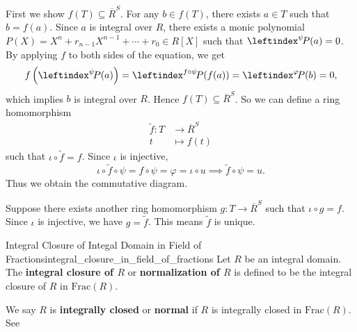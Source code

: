 \begin{prf}
    First we show $f(T)\subseteq \overline{R}^S$. For any $b\in f(T)$, there exists $a\in T$ such that $b=f(a)$. Since $a$ is integral over $R$, there exists a monic polynomial $P(X)=X^n+r_{n-1}X^{n-1}+\cdots+r_0\in R[X]$ such that $\leftindex^{\psi}\!P(a)=0$. By applying $f$ to both sides of the equation, we get
    \[
        f\left(\leftindex^{\psi}\!P(a)\right)=\leftindex^{f\circ \psi}\!P(f(a))=\leftindex^{\varphi}\!P(b)=0,
    \]
    which implies $b$ is integral over $R$. Hence $f(T)\subseteq \overline{R}^S$. So we can define a ring homomorphism
    \begin{align*}
        \widetilde{f}:T&\longrightarrow \overline{R}^S\\
        t&\longmapsto f(t)
    \end{align*}
   such that $\iota\circ \widetilde{f}=f$. Since $\iota$ is injective,
   \[
   \iota\circ \widetilde{f}\circ \psi=f\circ \psi=\varphi=\iota\circ u\implies \widetilde{f}\circ \psi=u.
   \]
   Thus we obtain the commutative diagram.

   Suppose there exists another ring homomorphism $g:T\to \overline{R}^S$ such that $\iota\circ g=f$. Since $\iota$ is injective, we have $g=\widetilde{f}$. This means $\widetilde{f}$ is unique.
\end{prf}
   

\begin{definition}{Integral Closure of Integal Domain in Field of Fractions}{integral_closure_in_field_of_fractions}
    Let $R$ be an integral domain. The \textbf{integral closure of $R$} or \textbf{normalization of $R$} is defined to be the integral closure of $R$ in $\mathrm{Frac}(R)$. 
\end{definition}
\begin{remark}
    We say $R$ is \textbf{integrally closed} or \textbf{normal} if $R$ is integrally closed in $\mathrm{Frac}(R)$. See 
\end{remark}

